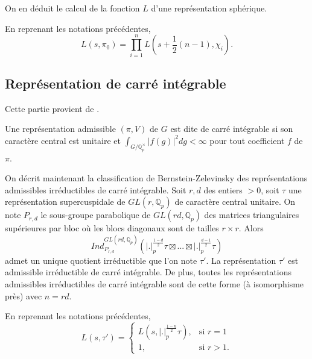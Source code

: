 On en déduit le calcul de la fonction $L$ d'une représentation sphérique.
\begin{proposition}
En reprenant les notations précédentes,
\begin{equation}
L(s, \pi_0) = \prod_{i=1}^n L(s+\frac{1}{2}(n-1), \chi_i).
\end{equation}
\end{proposition}

\subsection{Représentation de carré intégrable}

Cette partie provient de \cite{goldfeld-hundley}.
\begin{definition}
Une représentation admissible $(\pi, V)$ de $G$ est dite de carré intégrable si son caractère central est unitaire et $\int_{G/\mathbb{Q}_p^\times} |f(g)|^2 dg < \infty$ pour tout coefficient $f$ de $\pi$.
\end{definition}

On décrit maintenant la classification de Bernstein-Zelevinsky des représentations admissibles irréductibles de carré intégrable. Soit $r,d$ des entiers $> 0$, soit $\tau$ une représentation supercuspidale de $GL(r, \mathbb{Q}_p)$ de caractère central unitaire. On note $P_{r,d}$ le sous-groupe parabolique de $GL(rd, \mathbb{Q}_p)$ des matrices triangulaires supérieures par bloc où les blocs diagonaux sont de tailles $r \times r$. Alors
\begin{equation}
Ind_{P_{r,d}}^{GL(rd, \mathbb{Q}_p)}(|.|_p^{\frac{1-d}{2}}\tau \boxtimes ... \boxtimes |.|_p^{\frac{d-1}{2}}\tau)
\end{equation}
admet un unique quotient irréductible que l'on note $\tau'$. La représentation $\tau'$ est admissible irréductible de carré intégrable. De plus, toutes les représentations admissibles irréductibles de carré intégrable sont de cette forme (à isomorphisme près) avec $n=rd$.

\begin{proposition}
En reprenant les notations précédentes,
\begin{equation}
L(s, \tau') = \begin{cases}
    L(s,|.|_p^{\frac{1-n}{2}}\tau),& \text{si } r=1\\
    1,              & \text{si } r > 1.
\end{cases}
\end{equation}
\end{proposition}

